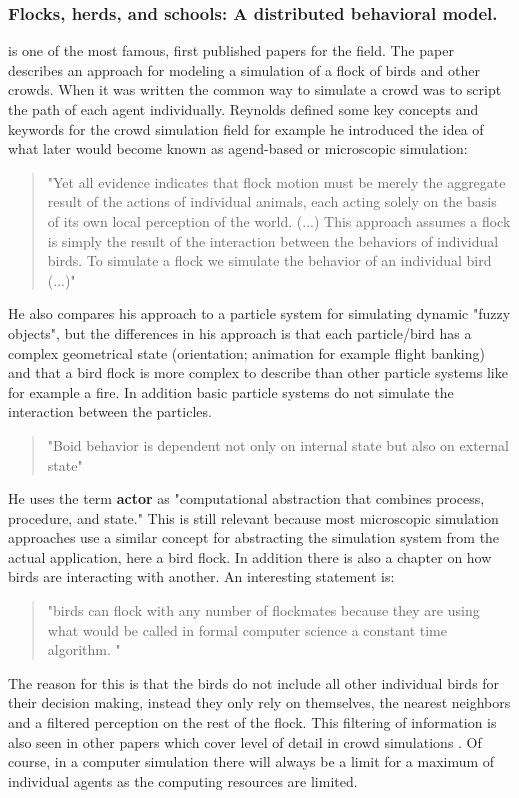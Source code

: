 \documentclass{acmsiggraph}               %
\begin{document}
\subsubsection{Flocks, herds, and schools: A distributed behavioral model.}\cite{reynolds_flocks_1987}
is one of the most famous, first published papers for the field. The paper describes an approach for modeling a simulation of a flock of birds and other crowds. When it was written the common way to simulate a crowd was to script the path of each agent individually. Reynolds defined some key concepts and keywords for the crowd simulation field for example he introduced the idea of what later would become known as agend-based or microscopic simulation:
\begin{quote}
"Yet all evidence indicates that flock motion must be merely the aggregate result of the actions of individual animals, each acting solely on the basis of its own local perception of the world. (...) This approach assumes a flock is simply the result of the interaction between the behaviors of individual birds. To simulate a flock we simulate the behavior of an individual bird (...)"
\end{quote}
He also compares his approach to a particle system for simulating dynamic "fuzzy objects", but the differences in his approach is that each particle/bird has a complex geometrical state (orientation; animation for example flight banking) and that a bird flock is more complex to describe than other particle systems like for example a fire. In addition basic particle systems do not simulate the interaction between the particles.  
\begin{quote}
"Boid behavior is dependent not only on internal state but also on external state"
\end{quote}
He uses the term \textbf{actor} as "computational abstraction that combines process, procedure, and state." This is still relevant because most microscopic simulation approaches use a similar concept for abstracting the simulation system from the actual application, here a bird flock.  
In addition there is also a chapter on how birds are interacting with another. An interesting statement is: 
\begin{quote}
"birds can flock with any number of flockmates because they are using what would be called in formal computer science a constant time algorithm. "
\end{quote}
The reason for this is that the birds do not include all other individual birds for their decision making, instead they only rely on themselves, the nearest neighbors and a filtered perception on the rest of the flock. This  filtering of  information is also seen in other papers which cover level of detail in crowd simulations \cite{osullivan_levels_2002}. Of course, in a computer simulation there will always be a limit for a maximum of individual agents as the computing resources are limited. 
\end{document}
